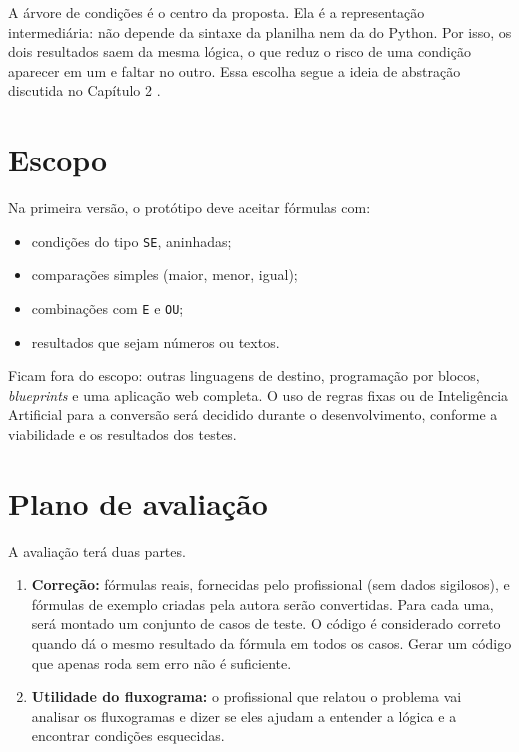 A árvore de condições é o centro da proposta. Ela é a representação intermediária: não depende da sintaxe da planilha nem da do Python. Por isso, os dois resultados saem da mesma lógica, o que reduz o risco de uma condição aparecer em um e faltar no outro. Essa escolha segue a ideia de abstração discutida no Capítulo 2 \cite{abelson1996}.

\section{Escopo}

Na primeira versão, o protótipo deve aceitar fórmulas com:

\begin{itemize}
    \item condições do tipo \texttt{SE}, aninhadas;
    \item comparações simples (maior, menor, igual);
    \item combinações com \texttt{E} e \texttt{OU};
    \item resultados que sejam números ou textos.
\end{itemize}

Ficam fora do escopo: outras linguagens de destino, programação por blocos, \textit{blueprints} e uma aplicação web completa. O uso de regras fixas ou de Inteligência Artificial para a conversão será decidido durante o desenvolvimento, conforme a viabilidade e os resultados dos testes.

\section{Plano de avaliação}

A avaliação terá duas partes.

\begin{enumerate}
    \item \textbf{Correção:} fórmulas reais, fornecidas pelo profissional (sem dados sigilosos), e fórmulas de exemplo criadas pela autora serão convertidas. Para cada uma, será montado um conjunto de casos de teste. O código é considerado correto quando dá o mesmo resultado da fórmula em todos os casos. Gerar um código que apenas roda sem erro não é suficiente.
    \item \textbf{Utilidade do fluxograma:} o profissional que relatou o problema vai analisar os fluxogramas e dizer se eles ajudam a entender a lógica e a encontrar condições esquecidas.
\end{enumerate}

